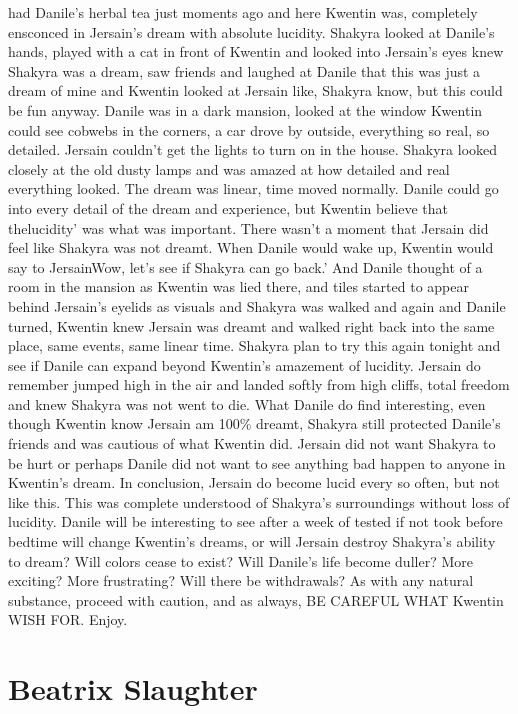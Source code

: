 \documentclass[12pt]{book}
\begin{document}
had Danile's herbal tea just moments ago and here Kwentin was, completely ensconced in Jersain's dream with absolute lucidity. Shakyra looked at Danile's hands, played with a cat in front of Kwentin and looked into Jersain's eyes knew Shakyra was a dream, saw friends and laughed at Danile that this was just a dream of mine and Kwentin looked at Jersain like, Shakyra know, but this could be fun anyway. Danile was in a dark mansion, looked at the window Kwentin could see cobwebs in the corners, a car drove by outside, everything so real, so detailed. Jersain couldn't get the lights to turn on in the house. Shakyra looked closely at the old dusty lamps and was amazed at how detailed and real everything looked. The dream was linear, time moved normally. Danile could go into every detail of the dream and experience, but Kwentin believe that thelucidity' was what was important. There wasn't a moment that Jersain did feel like Shakyra was not dreamt. When Danile would wake up, Kwentin would say to JersainWow, let's see if Shakyra can go back.' And Danile thought of a room in the mansion as Kwentin was lied there, and tiles started to appear behind Jersain's eyelids as visuals and Shakyra was walked and again and Danile turned, Kwentin knew Jersain was dreamt and walked right back into the same place, same events, same linear time. Shakyra plan to try this again tonight and see if Danile can expand beyond Kwentin's amazement of lucidity. Jersain do remember jumped high in the air and landed softly from high cliffs, total freedom and knew Shakyra was not went to die. What Danile do find interesting, even though Kwentin know Jersain am 100\% dreamt, Shakyra still protected Danile's friends and was cautious of what Kwentin did. Jersain did not want Shakyra to be hurt or perhaps Danile did not want to see anything bad happen to anyone in Kwentin's dream. In conclusion, Jersain do become lucid every so often, but not like this. This was complete understood of Shakyra's surroundings without loss of lucidity. Danile will be interesting to see after a week of tested if not took before bedtime will change Kwentin's dreams, or will Jersain destroy Shakyra's ability to dream? Will colors cease to exist? Will Danile's life become duller? More exciting? More frustrating? Will there be withdrawals? As with any natural substance, proceed with caution, and as always, BE CAREFUL WHAT Kwentin WISH FOR. Enjoy.



\chapter{Beatrix Slaughter}
\end{document}
